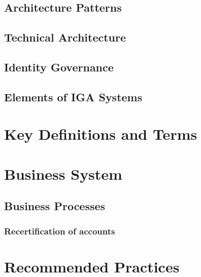 \hypertarget{architecture-patterns}{%
\subsection{Architecture Patterns }\label{architecture-patterns}}

\hypertarget{technical-architecture}{%
\subsection{Technical Architecture }\label{technical-architecture}}

\hypertarget{identity-governance}{%
\subsection{Identity Governance }\label{identity-governance}}

\hypertarget{elements-of-iga-systems}{%
\subsection{Elements of IGA Systems }\label{elements-of-iga-systems}}

\hypertarget{key-definitions-and-terms}{%
\section{Key Definitions and Terms
}\label{key-definitions-and-terms}}

\hypertarget{business-system}{%
\section{Business System}\label{business-system}}

\hypertarget{business-processes}{%
\subsection{Business Processes}\label{business-processes}}

\hypertarget{recertification-of-accounts}{%
\subsubsection{Recertification of
accounts}\label{recertification-of-accounts}}

\hypertarget{recommended-practices}{%
\section{Recommended Practices}\label{recommended-practices}}

